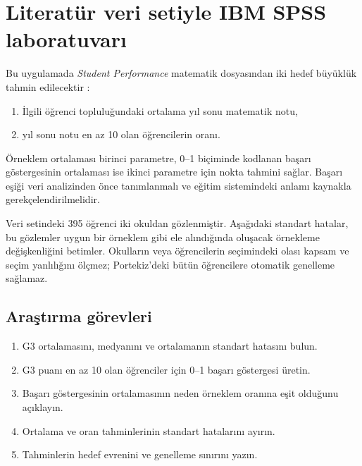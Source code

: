 \section{Literatür veri setiyle IBM SPSS laboratuvarı}

Bu uygulamada \emph{Student Performance} matematik dosyasından iki hedef
büyüklük tahmin edilecektir \cite{cortez2008data,cortezsilva2008}:

\begin{enumerate}
  \item İlgili öğrenci topluluğundaki ortalama yıl sonu matematik notu,
  \item yıl sonu notu en az 10 olan öğrencilerin oranı.
\end{enumerate}

Örneklem ortalaması birinci parametre, 0--1 biçiminde kodlanan başarı
göstergesinin ortalaması ise ikinci parametre için nokta tahmini sağlar.
Başarı eşiği veri analizinden önce tanımlanmalı ve eğitim sistemindeki anlamı
kaynakla gerekçelendirilmelidir.

\begin{researchbox}
Veri setindeki 395 öğrenci iki okuldan gözlenmiştir. Aşağıdaki standart
hatalar, bu gözlemler uygun bir örneklem gibi ele alındığında oluşacak
örnekleme değişkenliğini betimler. Okulların veya öğrencilerin seçimindeki
olası kapsam ve seçim yanlılığını ölçmez; Portekiz'deki bütün öğrencilere
otomatik genelleme sağlamaz.
\end{researchbox}

\subsection{Araştırma görevleri}

\begin{enumerate}
  \item G3 ortalamasını, medyanını ve ortalamanın standart hatasını bulun.
  \item G3 puanı en az 10 olan öğrenciler için 0--1 başarı göstergesi üretin.
  \item Başarı göstergesinin ortalamasının neden örneklem oranına eşit olduğunu açıklayın.
  \item Ortalama ve oran tahminlerinin standart hatalarını ayırın.
  \item Tahminlerin hedef evrenini ve genelleme sınırını yazın.
\end{enumerate}

